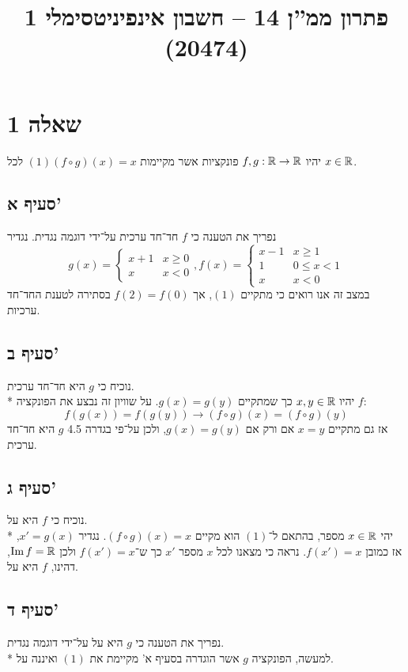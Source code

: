 
\title{פתרון ממ''ן 14 – חשבון אינפיניטסימלי 1 (20474)}


\maketitle
\section{שאלה 1}
יהיו $f, g: \mathbb{R} \to \mathbb{R}$ פונקציות אשר מקיימות $(1) (f \circ g)(x) = x$ לכל $x \in \mathbb{R}$.
\subsection{סעיף א'}
נפריך את הטענה כי $f$ חד־חד ערכית על־ידי דוגמה נגדית. נגדיר
\[
	g(x) = \begin{cases}
		x + 1 & x \ge 0 \\
		x & x < 0
	\end{cases},
	f(x) = \begin{cases}
		x - 1 & x \ge 1 \\
		1 & 0 \le x < 1 \\
		x & x < 0
	\end{cases}
\]
במצב זה אנו רואים כי מתקיים $(1)$, אך $f(2) = f(0)$ בסתירה לטענת החד־חד ערכיות.

\subsection{סעיף ב'}
נוכיח כי $g$ היא חד־חד ערכית. \\*
יהיו $x, y \in \mathbb{R}$ כך שמתקיים $g(x) = g(y)$.
על שוויון זה נבצע את הפונקציה $f$:
\[
	f(g(x)) = f(g(y))
	\rightarrow
	(f \circ g)(x) = (f \circ g)(y)
\]
אז גם מתקיים $x = y$ אם ורק אם $g(x) = g(y)$, ולכן על־פי בגדרה 4.5 $g$ היא חד־חד ערכית.

\subsection{סעיף ג'}
נוכיח כי $f$ היא על. \\*
יהי $x \in \mathbb{R}$ מספר, בהתאם ל־$(1)$ הוא מקיים $(f \circ g)(x) = x$.
נגדיר $x' = g(x)$, אז כמובן $f(x') = x$.
נראה כי מצאנו לכל $x$ מספר $x'$ כך ש־$f(x') = x$ ולכן $\operatorname{Im} f = \mathbb{R}$, דהינו, $f$ היא על.

\subsection{סעיף ד'}
נפריך את הטענה כי $g$ היא על על־ידי דוגמה נגדית. \\*
למעשה, הפונקציה $g$ אשר הוגדרה בסעיף א' מקיימת את $(1)$ ואיננה על.

